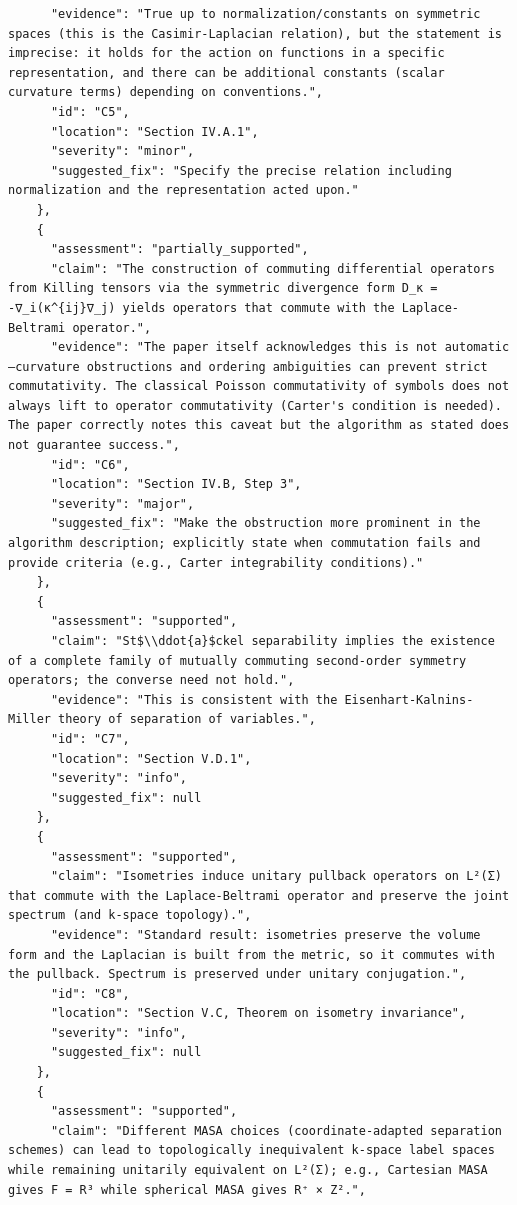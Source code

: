 \documentclass[11pt]{article}
\begin{document}
\begin{verbatim}
      "evidence": "True up to normalization/constants on symmetric spaces (this is the Casimir-Laplacian relation), but the statement is imprecise: it holds for the action on functions in a specific representation, and there can be additional constants (scalar curvature terms) depending on conventions.",
      "id": "C5",
      "location": "Section IV.A.1",
      "severity": "minor",
      "suggested_fix": "Specify the precise relation including normalization and the representation acted upon."
    },
    {
      "assessment": "partially_supported",
      "claim": "The construction of commuting differential operators from Killing tensors via the symmetric divergence form D_κ = -∇_i(κ^{ij}∇_j) yields operators that commute with the Laplace-Beltrami operator.",
      "evidence": "The paper itself acknowledges this is not automatic—curvature obstructions and ordering ambiguities can prevent strict commutativity. The classical Poisson commutativity of symbols does not always lift to operator commutativity (Carter's condition is needed). The paper correctly notes this caveat but the algorithm as stated does not guarantee success.",
      "id": "C6",
      "location": "Section IV.B, Step 3",
      "severity": "major",
      "suggested_fix": "Make the obstruction more prominent in the algorithm description; explicitly state when commutation fails and provide criteria (e.g., Carter integrability conditions)."
    },
    {
      "assessment": "supported",
      "claim": "St$\\ddot{a}$ckel separability implies the existence of a complete family of mutually commuting second-order symmetry operators; the converse need not hold.",
      "evidence": "This is consistent with the Eisenhart-Kalnins-Miller theory of separation of variables.",
      "id": "C7",
      "location": "Section V.D.1",
      "severity": "info",
      "suggested_fix": null
    },
    {
      "assessment": "supported",
      "claim": "Isometries induce unitary pullback operators on L²(Σ) that commute with the Laplace-Beltrami operator and preserve the joint spectrum (and k-space topology).",
      "evidence": "Standard result: isometries preserve the volume form and the Laplacian is built from the metric, so it commutes with the pullback. Spectrum is preserved under unitary conjugation.",
      "id": "C8",
      "location": "Section V.C, Theorem on isometry invariance",
      "severity": "info",
      "suggested_fix": null
    },
    {
      "assessment": "supported",
      "claim": "Different MASA choices (coordinate-adapted separation schemes) can lead to topologically inequivalent k-space label spaces while remaining unitarily equivalent on L²(Σ); e.g., Cartesian MASA gives F = R³ while spherical MASA gives R⁺ × Z².",

\end{verbatim}
\end{document}
